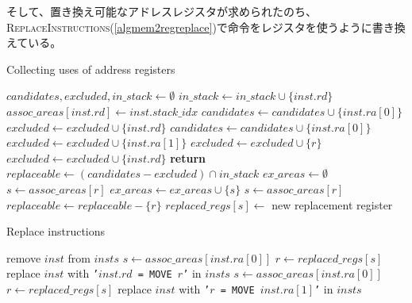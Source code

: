\documentclass[../main.tex]{subfiles}
\begin{document}
そして、置き換え可能なアドレスレジスタが求められたのち、\textsc{ReplaceInstructions}(\cref{algmem2regreplace})で命令をレジスタを使うように書き換えている。

\begin{algorithm}
\caption{Collecting uses of address registers}\label{algmem2regcollect}
\begin{algorithmic}[1]
  \State $candidates, excluded, in\_stack \gets \emptyset$
      \State $in\_stack \gets in\_stack \cup{ \{inst.rd\} }$
      \State $assoc\_areas[inst.rd] \gets inst.stack\_idx$
      \State $candidates \gets candidates \cup{ \{inst.ra[0]\} }$
      \State $excluded \gets excluded \cup{ \{inst.rd\} }$
      \State $candidates \gets candidates \cup{ \{inst.ra[0]\} }$
      \State $excluded \gets excluded \cup{ \{inst.ra[1]\} }$
    \Else
        \State $excluded \gets excluded \cup{ \{r\} }$
      \EndFor
        \State $excluded \gets excluded \cup{ \{inst.rd\} }$
      \EndIf
    \EndIf
  \EndFor
  \State \textbf{return} 
\EndFunction
{}
  \State $replaceable \gets (candidates - excluded) \cap {in\_stack}$
  \State $ex\_areas \gets \emptyset$
      \State $s \gets assoc\_areas[r]$
      \State $ex\_areas \gets ex\_areas \cup{\{s\}}$
    \EndIf
  \EndFor
    \State $s \gets assoc\_areas[r]$
      \State $replaceable \gets replaceable - \{r\}$
    \Else
        \State $replaced\_regs[s] \gets$ new replacement register
      \EndIf
    \EndIf
  \EndFor
\EndFunction
\end{algorithmic}
\end{algorithm}

\begin{algorithm}
\caption{Replace instructions}\label{algmem2regreplace}
\begin{algorithmic}[1]
        \State remove $inst$ from $insts$
      \EndIf
        \State $s \gets assoc\_areas[inst.ra[0]]$
        \State $r \gets replaced\_regs[s]$
        \State replace $inst$ with \texttt{'$inst.rd$ = MOVE $r$'} in $insts$
      \EndIf
        \State $s \gets assoc\_areas[inst.ra[0]]$
        \State $r \gets replaced\_regs[s]$
        \State replace $inst$ with \texttt{'$r$ = MOVE $inst.ra[1]$'} in $insts$
      \EndIf
    \EndIf
  \EndFor
\EndProcedure
\end{algorithmic}
\end{algorithm}
\end{document}
